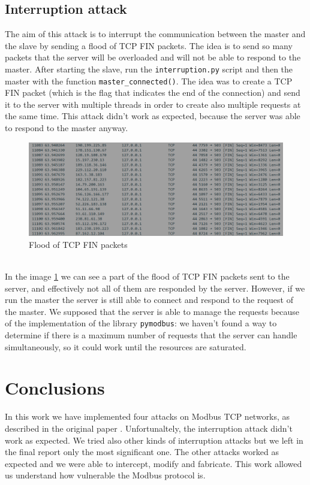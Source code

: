 \documentclass[12pt]{article}
\begin{document}
\subsection{Interruption attack}
The aim of this attack is to interrupt the communication between the master and the slave by sending a 
flood of TCP FIN packets. The idea is to send so many packets that the server will be overloaded and
will not be able to respond to the master.
After starting the slave, run the \texttt{interruption.py} script and then the master 
with the function \texttt{master\_connected()}.
The idea was to create a TCP FIN packet (which is the flag that indicates the end of the connection)
and send it to the server with multiple threads in order to create also multiple requests 
at the same time.
This attack didn't work as expected, because the server was able to respond to the master anyway.
\begin{figure}[h]
    \centering
    \includegraphics[width=1\textwidth]{images/wiresharkFINflood.png}
    \caption{Flood of TCP FIN packets}
    \label{fig:interruption}
\end{figure} \\
In the image \ref{fig:interruption} we can see a part of the flood of TCP FIN packets sent 
to the server, and effectively not all of them are responded by the server. However, if we run the master 
the server is still able to connect and respond to the request of the master.
We supposed that the server is able to manage the requests because of the implementation of the library 
\texttt{pymodbus}: we haven't found a way to determine if there is a maximum number of requests that 
the server can handle simultaneously, so it could work until the  resources are saturated.
\section{Conclusions}
In this work we have implemented four attacks on Modbus TCP networks, as described in the 
original paper \cite{huitsing2008attack}. Unfortunaltely, the interruption attack didn't work as expected.
We tried also other kinds of interruption attacks but we left in the final report only the most 
significant one. The other attacks worked as expected and we were able to intercept, 
modify and fabricate. This work allowed us understand how vulnerable the Modbus protocol is.
\printbibliography 
\end{document}
